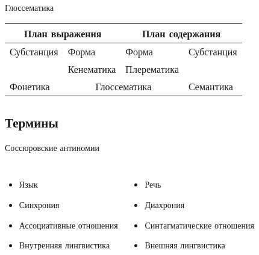 \begin{frame}{Глоссематика}
    \begin{table}[t]
        \begin{tabularx}{\textwidth}{XXXX}
            \multicolumn{2}{c}{План выражения} & \multicolumn{2}{c}{План содержания} \\ \midrule
            Субстанция & Форма & Форма & Субстанция \\ \midrule
            & Кенематика & Плерематика & \\ \midrule
            Фонетика & \multicolumn{2}{c}{Глоссематика} & Семантика \\
        \end{tabularx}
    \end{table}
\end{frame}

\subsection{Термины}

\begin{frame}{Соссюровские антиномии}
    \begin{columns}
        \begin{itemize}
            \item Язык
            \item Синхрония
            \item Ассоциативные отношения
            \item Внутренняя лингвистика
        \end{itemize}

        \begin{itemize}
            \item Речь
            \item Диахрония
            \item Синтагматические отношения
            \item Внешняя лингвистика
        \end{itemize}
    \end{columns}
\end{frame}

